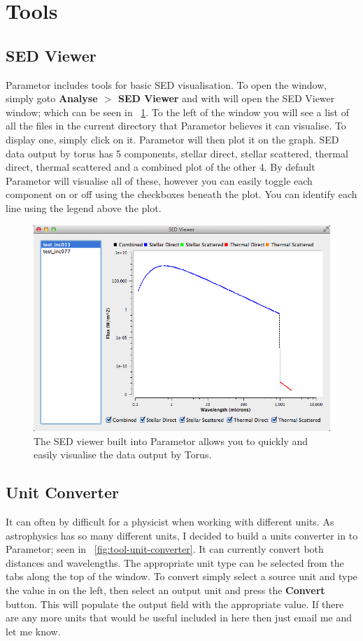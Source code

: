 \documentclass[a4paper,10pt]{article}
\newcommand{\figref}[2][\figurename~]{#1\ref{#2}}
\begin{document}
\section{Tools}

\subsection{SED Viewer}
Parametor includes tools for basic SED visualisation. To open the window, simply goto \textbf{Analyse $>$ SED Viewer} and with will open the SED Viewer window; which can be seen in \figref{fig:analyse-sed-viewer}. To the left of the window you will see a list of all the files in the current directory that Parametor believes it can visualise. To display one, simply click on it. Parametor will then plot it on the graph. SED data output by torus has 5 components, stellar direct, stellar scattered, thermal direct, thermal scattered and a combined plot of the other 4. By default Parametor will visualise all of these, however you can easily toggle each component on or off using the checkboxes beneath the plot. You can identify each line using the legend above the plot.

\begin{figure}
\centering
\includegraphics[width=12.5cm]{img/analyse-sed-viewer.png}
\caption{The SED viewer built into Parametor allows you to quickly and easily visualise the data output by Torus.}
\label{fig:analyse-sed-viewer}
\end{figure}

\subsection{Unit Converter}
It can often by difficult for a physicist when working with different units. As astrophysics has so many different units, I decided to build a units converter in to Parametor; seen in \figref{fig:tool-unit-converter}. It can currently convert both distances and wavelengths. The appropriate unit type can be selected from the tabs along the top of the window. To convert simply select a source unit and type the value in on the left, then select an output unit and press the \textbf{Convert} button. This will populate the output field with the appropriate value. If there are any more units that would be useful included in here then just email me and let me know.
\end{document}
